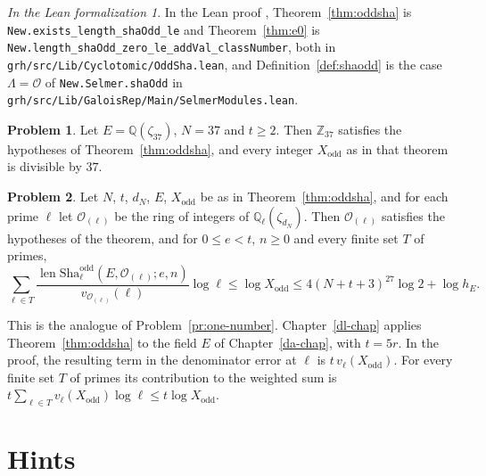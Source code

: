 \documentclass[reqno]{amsart}
\newcounter{chap}
\theoremstyle{definition}
\newtheorem{problem}{Problem}[section]
\theoremstyle{plain}
\theoremstyle{remark}
\newtheorem*{leanremark}{In the Lean formalization}
\newcommand{\Z}{\mathbb{Z}}
\newcommand{\Q}{\mathbb{Q}}
\newcommand{\Ql}{\Q_\ell}
\newcommand{\Oc}{\mathcal{O}}
\newcommand{\len}{\operatorname{len}}
\newcommand{\Sha}{\mathrm{Sha}}
\newcommand{\Shao}{\Sha^{\mathrm{odd}}}
\newcommand{\tl}[1]{\texttt{#1}}
\begin{document}
\begin{leanremark}
\raggedright In the Lean proof \cite{GL}, Theorem~\ref{thm:oddsha} is \tl{New.exists\_length\_shaOdd\_le} and Theorem~\ref{thm:e0} is \tl{New.length\_shaOdd\_zero\_le\_addVal\_classNumber}, both in \tl{grh/src/Lib/Cyclotomic/OddSha.lean}, and Definition~\ref{def:shaodd} is the case \(\Lambda = \Oc\) of \tl{New.Selmer.shaOdd} in \tl{grh/src/Lib/GaloisRep/Main/SelmerModules.lean}.
\end{leanremark}

\begin{problem}\label{pr:37}
Let \(E = \Q(\zeta_{37})\), \(N = 37\) and \(t \ge 2\).  Then \(\Z_{37}\) satisfies the hypotheses of Theorem~\ref{thm:oddsha}, and every integer \(X_{\mathrm{odd}}\) as in that theorem is divisible by \(37\).
\end{problem}

\begin{problem}\label{pr:sum-ell}
Let \(N\), \(t\), \(d_N\), \(E\), \(X_{\mathrm{odd}}\) be as in Theorem~\ref{thm:oddsha}, and for each prime \(\ell\) let \(\Oc_{(\ell)}\) be the ring of integers of \(\Ql(\zeta_{d_N})\).  Then \(\Oc_{(\ell)}\) satisfies the hypotheses of the theorem, and for \(0 \le e < t\), \(n \ge 0\) and every finite set \(T\) of primes,
\[
  \sum_{\ell \in T} \frac{\len \Shao_\ell(E, \Oc_{(\ell)}; e, n)}{v_{\Oc_{(\ell)}}(\ell)} \log \ell \le \log X_{\mathrm{odd}} \le 4 (N + t + 3)^{27} \log 2 + \log h_E .
\]
\end{problem}

This is the analogue of Problem~\ref{pr:one-number}.  Chapter~\ref{dl-chap} applies Theorem~\ref{thm:oddsha} to the field \(E\) of Chapter~\ref{da-chap}, with \(t = 5r\).  In the proof, the resulting term in the denominator error at \(\ell\) is \(t\,v_\ell(X_{\mathrm{odd}})\).  For every finite set \(T\) of primes its contribution to the weighted sum is \(t\sum_{\ell\in T} v_\ell(X_{\mathrm{odd}})\log\ell \le t\log X_{\mathrm{odd}}\).

\section*{Hints}
\end{document}
